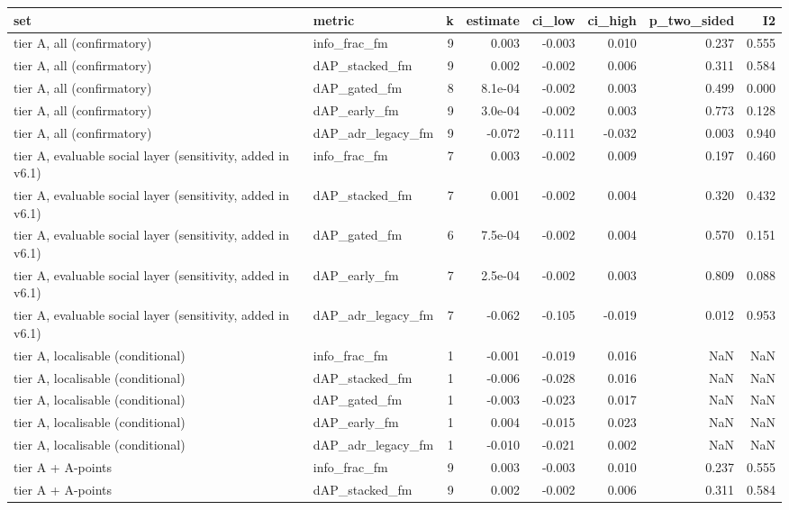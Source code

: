 \begin{tabular}{llrrrrrr}
\toprule
set & metric & k & estimate & ci_low & ci_high & p_two_sided & I2 \\
\midrule
tier A, all (confirmatory) & info\_frac\_fm & 9 & 0.003 & -0.003 & 0.010 & 0.237 & 0.555 \\
tier A, all (confirmatory) & dAP\_stacked\_fm & 9 & 0.002 & -0.002 & 0.006 & 0.311 & 0.584 \\
tier A, all (confirmatory) & dAP\_gated\_fm & 8 & 8.1e-04 & -0.002 & 0.003 & 0.499 & 0.000 \\
tier A, all (confirmatory) & dAP\_early\_fm & 9 & 3.0e-04 & -0.002 & 0.003 & 0.773 & 0.128 \\
tier A, all (confirmatory) & dAP\_adr\_legacy\_fm & 9 & -0.072 & -0.111 & -0.032 & 0.003 & 0.940 \\
tier A, evaluable social layer (sensitivity, added in v6.1) & info\_frac\_fm & 7 & 0.003 & -0.002 & 0.009 & 0.197 & 0.460 \\
tier A, evaluable social layer (sensitivity, added in v6.1) & dAP\_stacked\_fm & 7 & 0.001 & -0.002 & 0.004 & 0.320 & 0.432 \\
tier A, evaluable social layer (sensitivity, added in v6.1) & dAP\_gated\_fm & 6 & 7.5e-04 & -0.002 & 0.004 & 0.570 & 0.151 \\
tier A, evaluable social layer (sensitivity, added in v6.1) & dAP\_early\_fm & 7 & 2.5e-04 & -0.002 & 0.003 & 0.809 & 0.088 \\
tier A, evaluable social layer (sensitivity, added in v6.1) & dAP\_adr\_legacy\_fm & 7 & -0.062 & -0.105 & -0.019 & 0.012 & 0.953 \\
tier A, localisable (conditional) & info\_frac\_fm & 1 & -0.001 & -0.019 & 0.016 & NaN & NaN \\
tier A, localisable (conditional) & dAP\_stacked\_fm & 1 & -0.006 & -0.028 & 0.016 & NaN & NaN \\
tier A, localisable (conditional) & dAP\_gated\_fm & 1 & -0.003 & -0.023 & 0.017 & NaN & NaN \\
tier A, localisable (conditional) & dAP\_early\_fm & 1 & 0.004 & -0.015 & 0.023 & NaN & NaN \\
tier A, localisable (conditional) & dAP\_adr\_legacy\_fm & 1 & -0.010 & -0.021 & 0.002 & NaN & NaN \\
tier A + A-points & info\_frac\_fm & 9 & 0.003 & -0.003 & 0.010 & 0.237 & 0.555 \\
tier A + A-points & dAP\_stacked\_fm & 9 & 0.002 & -0.002 & 0.006 & 0.311 & 0.584 \\

\end{tabular}
